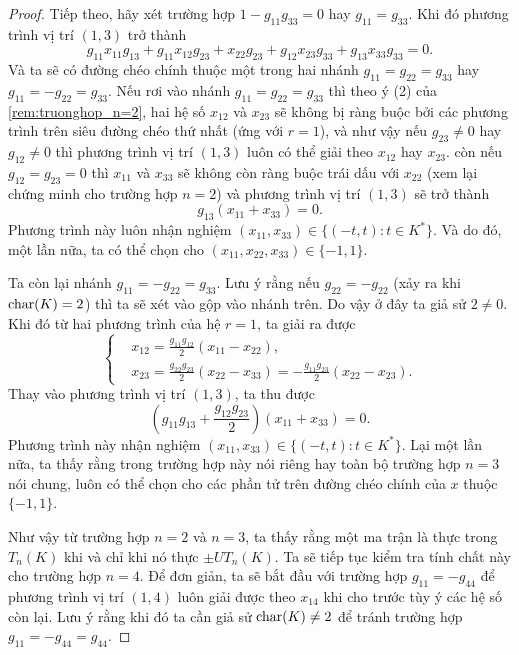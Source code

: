\begin{proof}
    Tiếp theo, hãy xét trường hợp $1 - g_{11} g_{33} = 0$ hay $g_{11} = g_{33}$. Khi đó phương trình vị trí $(1,3)$ trở thành
    \[
        g_{11} x_{11} g_{13} + g_{11} x_{12} g_{23}
        + x_{22} g_{23} + g_{12} x_{23} g_{33} + g_{13} x_{33} g_{33} = 0.
    \]
    Và ta sẽ có đường chéo chính thuộc một trong hai nhánh $g_{11} = g_{22} = g_{33}$ hay $g_{11} = -g_{22} = g_{33}$. Nếu rơi vào nhánh $g_{11} = g_{22} = g_{33}$ thì theo ý (2) của \cref{rem:truonghop_n=2}, hai hệ số $x_{12}$ và $x_{23}$ sẽ không bị ràng buộc bởi các phương trình trên siêu đường chéo thứ nhất (ứng với $r = 1$), và như vậy nếu $g_{23} \neq 0$ hay $g_{12} \neq 0$ thì phương trình vị trí $(1,3)$ luôn có thể giải theo $x_{12}$ hay $x_{23}$. còn nếu $g_{12} = g_{23} = 0$ thì $x_{11}$ và $x_{33}$ sẽ không còn ràng buộc trái dấu với $x_{22}$ (xem lại chứng minh cho trường hợp $n =  2$) và phương trình vị trí $(1,3)$ sẽ trở thành
    \[
        g_{13} (x_{11} + x_{33}) = 0.
    \]
    Phương trình này luôn nhận nghiệm $(x_{11}, x_{33}) \in \{ (-t,t): t \in K^* \}$. Và do đó, một lần nữa, ta có thể chọn cho $(x_{11},x_{22},x_{33}) \in \{-1,1\}$.

    Ta còn lại nhánh $g_{11} = -g_{22} = g_{33}$. Lưu ý rằng nếu $g_{22} = -g_{22}$ (xảy ra khi $\operatorname{char}(K) = 2$) thì ta sẽ xét vào gộp vào nhánh trên. Do vậy ở đây ta giả sử $2 \neq 0$. Khi đó từ hai phương trình của hệ $r = 1$, ta giải ra được
    \[
        \left\{ \begin{aligned}
            & x_{12} = \frac{g_{11} g_{12}}{2} (x_{11} - x_{22}), \\      & x_{23} = \frac{g_{22} g_{23}}{2} (x_{22} -x_{33}) = -\frac{g_{11} g_{23}}{2} (x_{22} - x_{23}).     
        \end{aligned} \right.
    \]
    Thay vào phương trình vị trí $(1,3)$, ta thu được
    \[
        \left( g_{11} g_{13} + \frac{g_{12} g_{23}}{2} \right) (x_{11} + x_{33}) = 0.
    \]
    Phương trình này nhận nghiệm $(x_{11},x_{33}) \in \{(-t,t): t \in K^*\}$. Lại một lần nữa, ta thấy rằng trong trường hợp này nói riêng hay toàn bộ trường hợp $n = 3$ nói chung, luôn có thể chọn cho các phần tử trên đường chéo chính của $x$ thuộc $\{-1,1\}$.

 Như vậy từ trường hợp $n = 2$ và $n = 3$, ta thấy rằng một ma trận là thực trong $T_n(K)$ khi và chỉ khi nó thực $\pm UT_n(K)$. Ta sẽ tiếp tục kiểm tra tính chất này cho trường hợp $n = 4$. Để đơn giản, ta sẽ bắt đầu với trường hợp \( g_{11} = -g_{44} \) để phương trình vị trí $(1,4)$ luôn giải được theo $x_{14}$ khi cho trước tùy ý các hệ số còn lại. Lưu ý rằng khi đó ta cần giả sử \( \operatorname{char}(K) \neq 2 \) để tránh trường hợp $g_{11} = -g_{44} = g_{44}$.


\end{proof}
